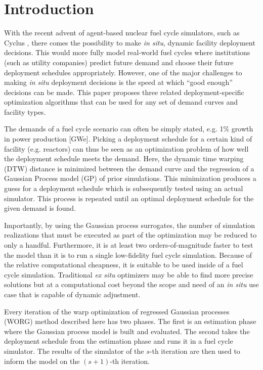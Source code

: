 \section{Introduction}
\label{intro}

With the recent advent of agent-based nuclear fuel cycle simulators, such as
Cyclus \cite{DBLP:journals/corr/HuffGCFMOSSW15,cyclus_v1_0}, there comes the
possibility to make \emph{in situ}, dynamic facility deployment decisions.
This  would more fully model real-world fuel cycles where institutions
(such as utility companies)
predict future demand and choose their future deployment schedules
appropriately. However, one of the major challenges to making \emph{in situ}
deployment decisions is the speed at which ``good enough'' decisions can
be made. This paper proposes three related deployment-specific optimization
algorithms that can be used for any set of demand curves and facility types.

The demands of a fuel cycle scenario can often be simply stated, e.g.
1\% growth in power production [GWe]. Picking a deployment schedule for a
certain kind of facility (e.g. reactors) can thus be seen as an optimization
problem of how well the deployment schedule meets the demand. Here, the
dynamic time warping (DTW) \cite{muller} distance is minimized
between the demand curve and the regression of a Gaussian Process model (GP)
\cite{rasmussen2006gaussian} of prior simulations. This minimization produces
a guess for a deployment schedule which is subsequently tested using
an actual simulator. This process is repeated until an optimal deployment
schedule for the given demand is found.

Importantly, by using the Gaussian process surrogates, the number of
simulation realizations that must be executed as part of the optimization may
be reduced to only a handful. Furthermore, it is at least two
orders-of-magnitude faster to test the model than it is to run a single
low-fidelity fuel cycle simulation. Because of the relative computational
cheapness, it
is suitable to be used inside of a fuel cycle simulation. Traditional
\emph{ex situ} optimizers may be able to find more precise solutions but at a
computational cost beyond the scope and need of an \emph{in situ} use case
that is capable of dynamic adjustment.

Every iteration of the warp optimization of regressed Gaussian processes (WORG)
method described here has two phases. The first is an estimation phase where
the Gaussian process model is built and evaluated. The second takes the
deployment schedule from the estimation phase and runs it in a fuel cycle
simulator. The results of the simulator of the $s$-th iteration are then
used to inform the model on the $(s+1)$-th iteration.

